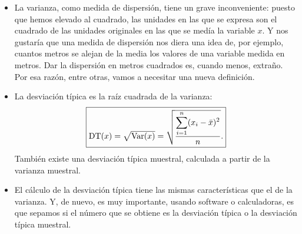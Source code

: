 \begin{itemize}
    \item La varianza, como medida de dispersión, tiene un grave inconveniente: puesto que hemos elevado al cuadrado, las unidades en las que se expresa son el cuadrado de las unidades originales en las que se medía la variable $x$. Y nos gustaría que una medida de dispersión nos diera una idea de, por ejemplo, cuantos metros se alejan de la media los valores de una variable medida en metros. Dar la dispersión en metros cuadrados es, cuando menos, extraño. Por esa razón, entre otras, vamos a necesitar una nueva definición.

    \item La {\sf desviación típica} es la raíz cuadrada de la varianza:
            \begin{equation}
        \fbox{$\mbox{DT($x$)}=\sqrt{\mbox{Var($x$)}} =\sqrt{\dfrac{\displaystyle\sum_{i=1}^n(x_i-\bar x)^2}{n}}.$}
        \end{equation}
        También existe una {\sf desviación típica muestral}, calculada a partir de la varianza muestral.

    \item El cálculo de la desviación típica tiene las mismas características que el de la varianza. Y, de nuevo, es {\sf\large muy importante}, usando software o calculadoras, es que sepamos si el número que se obtiene es la desviación típica o la desviación típica muestral.


\end{itemize}


%




